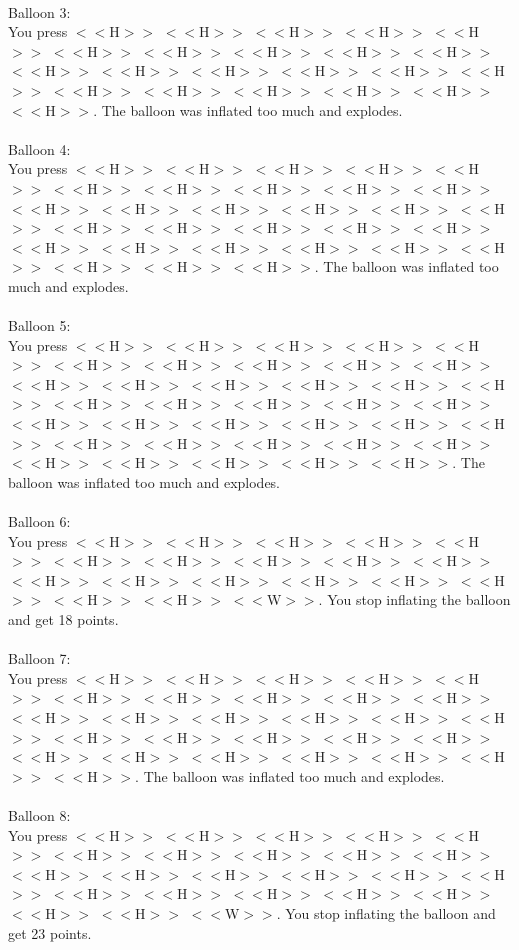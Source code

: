 \documentclass[pdflatex,sn-nature]{sn-jnl}%
\theoremstyle{thmstyleone}%
\theoremstyle{thmstyletwo}%
\theoremstyle{thmstylethree}%
\begin{document}
 $~$\\ 
Balloon 3: $~$\\ 
You press $<<$H$>>$ $<<$H$>>$ $<<$H$>>$ $<<$H$>>$ $<<$H$>>$ $<<$H$>>$ $<<$H$>>$ $<<$H$>>$ $<<$H$>>$ $<<$H$>>$ $<<$H$>>$ $<<$H$>>$ $<<$H$>>$ $<<$H$>>$ $<<$H$>>$ $<<$H$>>$ $<<$H$>>$ $<<$H$>>$ $<<$H$>>$ $<<$H$>>$ $<<$H$>>$ $<<$H$>>$. The balloon was inflated too much and explodes. $~$\\ 
 $~$\\ 
Balloon 4: $~$\\ 
You press $<<$H$>>$ $<<$H$>>$ $<<$H$>>$ $<<$H$>>$ $<<$H$>>$ $<<$H$>>$ $<<$H$>>$ $<<$H$>>$ $<<$H$>>$ $<<$H$>>$ $<<$H$>>$ $<<$H$>>$ $<<$H$>>$ $<<$H$>>$ $<<$H$>>$ $<<$H$>>$ $<<$H$>>$ $<<$H$>>$ $<<$H$>>$ $<<$H$>>$ $<<$H$>>$ $<<$H$>>$ $<<$H$>>$ $<<$H$>>$ $<<$H$>>$ $<<$H$>>$ $<<$H$>>$ $<<$H$>>$ $<<$H$>>$ $<<$H$>>$. The balloon was inflated too much and explodes. $~$\\ 
 $~$\\ 
Balloon 5: $~$\\ 
You press $<<$H$>>$ $<<$H$>>$ $<<$H$>>$ $<<$H$>>$ $<<$H$>>$ $<<$H$>>$ $<<$H$>>$ $<<$H$>>$ $<<$H$>>$ $<<$H$>>$ $<<$H$>>$ $<<$H$>>$ $<<$H$>>$ $<<$H$>>$ $<<$H$>>$ $<<$H$>>$ $<<$H$>>$ $<<$H$>>$ $<<$H$>>$ $<<$H$>>$ $<<$H$>>$ $<<$H$>>$ $<<$H$>>$ $<<$H$>>$ $<<$H$>>$ $<<$H$>>$ $<<$H$>>$ $<<$H$>>$ $<<$H$>>$ $<<$H$>>$ $<<$H$>>$ $<<$H$>>$ $<<$H$>>$ $<<$H$>>$ $<<$H$>>$ $<<$H$>>$ $<<$H$>>$. The balloon was inflated too much and explodes. $~$\\ 
 $~$\\ 
Balloon 6: $~$\\ 
You press $<<$H$>>$ $<<$H$>>$ $<<$H$>>$ $<<$H$>>$ $<<$H$>>$ $<<$H$>>$ $<<$H$>>$ $<<$H$>>$ $<<$H$>>$ $<<$H$>>$ $<<$H$>>$ $<<$H$>>$ $<<$H$>>$ $<<$H$>>$ $<<$H$>>$ $<<$H$>>$ $<<$H$>>$ $<<$H$>>$ $<<$W$>>$. You stop inflating the balloon and get 18 points. $~$\\ 
 $~$\\ 
Balloon 7: $~$\\ 
You press $<<$H$>>$ $<<$H$>>$ $<<$H$>>$ $<<$H$>>$ $<<$H$>>$ $<<$H$>>$ $<<$H$>>$ $<<$H$>>$ $<<$H$>>$ $<<$H$>>$ $<<$H$>>$ $<<$H$>>$ $<<$H$>>$ $<<$H$>>$ $<<$H$>>$ $<<$H$>>$ $<<$H$>>$ $<<$H$>>$ $<<$H$>>$ $<<$H$>>$ $<<$H$>>$ $<<$H$>>$ $<<$H$>>$ $<<$H$>>$ $<<$H$>>$ $<<$H$>>$ $<<$H$>>$ $<<$H$>>$. The balloon was inflated too much and explodes. $~$\\ 
 $~$\\ 
Balloon 8: $~$\\ 
You press $<<$H$>>$ $<<$H$>>$ $<<$H$>>$ $<<$H$>>$ $<<$H$>>$ $<<$H$>>$ $<<$H$>>$ $<<$H$>>$ $<<$H$>>$ $<<$H$>>$ $<<$H$>>$ $<<$H$>>$ $<<$H$>>$ $<<$H$>>$ $<<$H$>>$ $<<$H$>>$ $<<$H$>>$ $<<$H$>>$ $<<$H$>>$ $<<$H$>>$ $<<$H$>>$ $<<$H$>>$ $<<$H$>>$ $<<$W$>>$. You stop inflating the balloon and get 23 points. $~$\\ 
\end{document}
